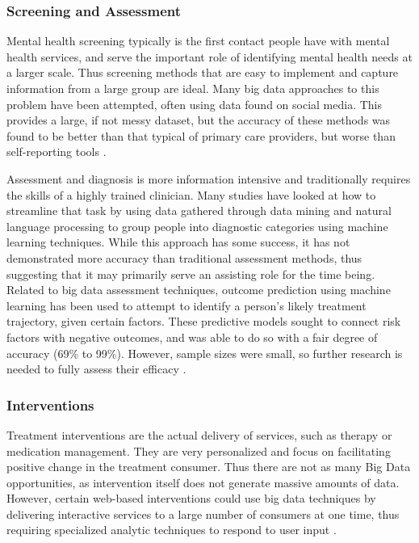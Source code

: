 \documentclass[sigconf]{acmart}
\begin{document}
\subsubsection{Screening and Assessment}

Mental health screening typically is the first contact people have with mental health  services, and serve the important role of identifying mental health needs at a larger scale. Thus screening methods that are easy to implement and capture information from a large group are ideal. Many big data approaches to this problem have been attempted, often using data found on social media. This provides a large, if not messy dataset, but the accuracy of these methods was found to be better than that typical of primary care providers, but worse than self-reporting tools \cite{detectdepressionsocialmedia}.

Assessment and diagnosis is more information intensive and traditionally requires the skills of a highly trained clinician. Many studies have looked at how to streamline that task by using data gathered through data mining and natural language processing to group people into diagnostic categories using machine learning techniques. While this approach has some success, it has not demonstrated more accuracy than traditional assessment methods, thus suggesting that it may primarily serve an assisting role for the time being. Related to big data assessment techniques, outcome prediction using machine learning has been used to attempt to identify a person's likely treatment trajectory, given certain factors. These predictive models sought to connect risk factors with negative outcomes, and was able to do so with a fair degree of accuracy (69\% to 99\%). However, sample sizes were small, so further research is needed to fully assess their efficacy \cite{machinelearnbipolar,bigdatabipolar}.

\subsubsection{Interventions}

Treatment interventions are the actual delivery of services, such as therapy or medication management. They are very personalized and focus on facilitating positive change in the treatment consumer. Thus there are not as many Big Data opportunities, as intervention itself does not generate massive amounts of data. However, certain web-based interventions could use big data techniques by delivering interactive services to a large number of consumers at one time, thus requiring specialized analytic techniques to respond to user input \cite{bitreview,webtx}. 
\end{document}
